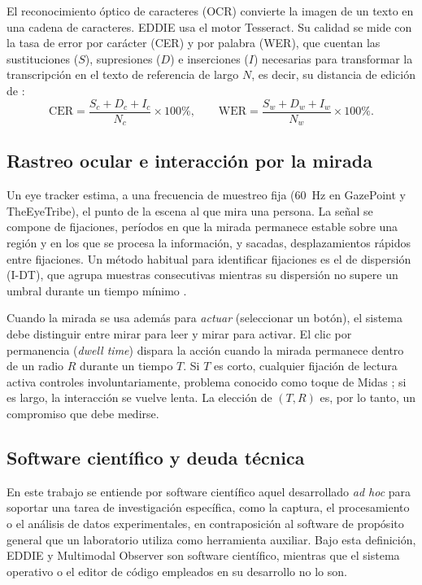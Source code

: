 El reconocimiento óptico de caracteres (OCR) convierte la imagen de un texto en una cadena de caracteres. EDDIE usa el motor Tesseract. Su calidad se mide con la tasa de error por carácter (CER) y por palabra (WER), que cuentan las sustituciones ($S$), supresiones ($D$) e inserciones ($I$) necesarias para transformar la transcripción en el texto de referencia de largo $N$, es decir, su distancia de edición de \citet{levenshtein1966}:
\begin{equation}
\mathrm{CER}=\frac{S_c+D_c+I_c}{N_c}\times100\%,\qquad
\mathrm{WER}=\frac{S_w+D_w+I_w}{N_w}\times100\%.
\end{equation}

\subsection{Rastreo ocular e interacción por la mirada}

Un eye tracker estima, a una frecuencia de muestreo fija (60~Hz en GazePoint y TheEyeTribe), el punto de la escena al que mira una persona. La señal se compone de fijaciones, períodos en que la mirada permanece estable sobre una región y en los que se procesa la información, y sacadas, desplazamientos rápidos entre fijaciones. Un método habitual para identificar fijaciones es el de dispersión (I-DT), que agrupa muestras consecutivas mientras su dispersión no supere un umbral durante un tiempo mínimo \citep{salvucci2000}.

Cuando la mirada se usa además para \emph{actuar} (seleccionar un botón), el sistema debe distinguir entre mirar para leer y mirar para activar. El clic por permanencia (\textit{dwell time}) dispara la acción cuando la mirada permanece dentro de un radio $R$ durante un tiempo $T$. Si $T$ es corto, cualquier fijación de lectura activa controles involuntariamente, problema conocido como toque de Midas \citep{jacob1990}; si es largo, la interacción se vuelve lenta. La elección de $(T,R)$ es, por lo tanto, un compromiso que debe medirse.

\subsection{Software científico y deuda técnica}

En este trabajo se entiende por software científico aquel desarrollado \textit{ad hoc} para soportar una tarea de investigación específica, como la captura, el procesamiento o el análisis de datos experimentales, en contraposición al software de propósito general que un laboratorio utiliza como herramienta auxiliar. Bajo esta definición, EDDIE y Multimodal Observer son software científico, mientras que el sistema operativo o el editor de código empleados en su desarrollo no lo son.

